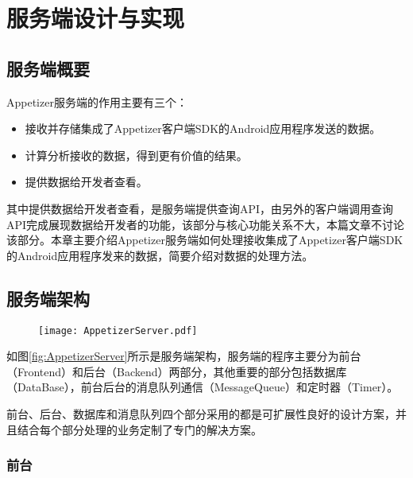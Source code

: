 
\chapter{服务端设计与实现}
\label{chap:server}

\section{服务端概要}
\label{sec:serverOverview}

Appetizer服务端的作用主要有三个：

\begin{itemize}
	\item 接收并存储集成了Appetizer客户端SDK的Android应用程序发送的数据。
	\item 计算分析接收的数据，得到更有价值的结果。
	\item 提供数据给开发者查看。
\end{itemize}

其中提供数据给开发者查看，是服务端提供查询API，由另外的客户端调用查询API完成展现数据给开发者的功能，该部分与核心功能关系不大，本篇文章不讨论该部分。本章主要介绍Appetizer服务端如何处理接收集成了Appetizer客户端SDK的Android应用程序发来的数据，简要介绍对数据的处理方法。

\section{服务端架构}
\label{sec:serverArch}

\begin{figure}[!htp]
	\centering
	\texttt{[image: AppetizerServer.pdf]}
\end{figure}


如图\ref{fig:AppetizerServer}所示是服务端架构，服务端的程序主要分为前台（Frontend）和后台（Backend）两部分，其他重要的部分包括数据库（DataBase），前台后台的消息队列通信（MessageQueue）和定时器（Timer）。

前台、后台、数据库和消息队列四个部分采用的都是可扩展性良好的设计方案，并且结合每个部分处理的业务定制了专门的解决方案。

\subsection{前台}
\label{subsec:serverFrontend}

